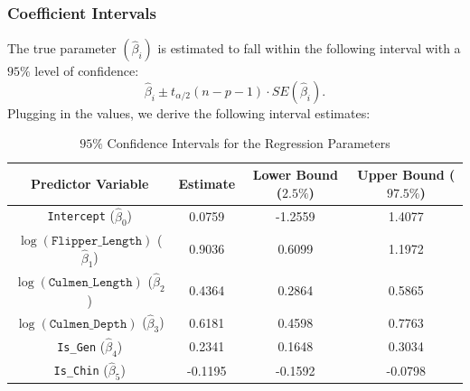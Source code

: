 \documentclass[12pt]{article}
\begin{document}
  \subsubsection{Coefficient Intervals}
  The true parameter $(\hat{\beta}_i)$ is estimated to fall
  within the following interval with a $95\%$ level of confidence:
  \[
    \hat{\beta}_i \pm t_{{\alpha}/{2}}(n-p-1)\cdot SE(\hat{\beta}_i)
    .\]
  Plugging in the values, we derive the following interval estimates:
  \begin{table}[H]
    \centering
    \begin{tabular}{|| c | c | c c ||}
      \hline
      \textbf{Predictor Variable}
      & \textbf{Estimate}
      & \textbf{Lower Bound ($2.5\%$)}
      & \textbf{Upper Bound ($97.5\%$)} \\[0.5ex]
      \hline\hline
      \texttt{Intercept} ($\hat{\beta}_0$) & 0.0759 & -1.2559 & 1.4077 \\
      $\log(\texttt{Flipper\_Length})$ ($\hat{\beta}_1$) & 0.9036 & 0.6099 & 1.1972 \\
      $\log(\texttt{Culmen\_Length})$ ($\hat{\beta}_2$) & 0.4364 & 0.2864 & 0.5865 \\
      $\log(\texttt{Culmen\_Depth})$ ($\hat{\beta}_3$) & 0.6181 & 0.4598 & 0.7763 \\
      \texttt{Is\_Gen} ($\hat{\beta}_4$) & 0.2341 & 0.1648 & 0.3034 \\
      \texttt{Is\_Chin} ($\hat{\beta}_5$) & -0.1195 & -0.1592 & -0.0798 \\
      \hline
    \end{tabular}
    \caption{$95\%$ Confidence Intervals for the Regression Parameters}
  \end{table}
\end{document}
